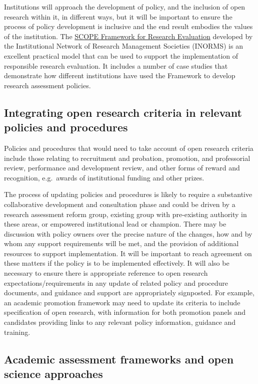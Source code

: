\documentclass[
  letterpaper,
  DIV=11,
  numbers=noendperiod,
  oneside]{scrreprt}
\begin{document}
Institutions will approach the development of policy, and the inclusion
of open research within it, in different ways, but it will be important
to ensure the process of policy development is inclusive and the end
result embodies the values of the institution. The
\href{https://inorms.net/scope-framework-for-research-evaluation/}{SCOPE
Framework for Research Evaluation} developed by the Institutional
Network of Research Management Societies (INORMS) is an excellent
practical model that can be used to support the implementation of
responsible research evaluation. It includes a number of case studies
that demonstrate how different institutions have used the Framework to
develop research assessment policies.

\subsection{Integrating open research criteria in relevant policies and
procedures}\label{integrating-open-research-criteria-in-relevant-policies-and-procedures}

Policies and procedures that would need to take account of open research
criteria include those relating to recruitment and probation, promotion,
and professorial review, performance and development review, and other
forms of reward and recognition, e.g.~awards of institutional funding
and other prizes.

The process of updating policies and procedures is likely to require a
substantive collaborative development and consultation phase and could
be driven by a research assessment reform group, existing group with
pre-existing authority in these areas, or empowered institutional lead
or champion. There may be discussion with policy owners over the precise
nature of the changes, how and by whom any support requirements will be
met, and the provision of additional resources to support
implementation. It will be important to reach agreement on these matters
if the policy is to be implemented effectively. It will also be
necessary to ensure there is appropriate reference to open research
expectations/requirements in any update of related policy and procedure
documents, and guidance and support are appropriately signposted. For
example, an academic promotion framework may need to update its criteria
to include specification of open research, with information for both
promotion panels and candidates providing links to any relevant policy
information, guidance and training.

\subsection{Academic assessment frameworks and open science
approaches}\label{academic-assessment-frameworks-and-open-science-approaches}
\end{document}
